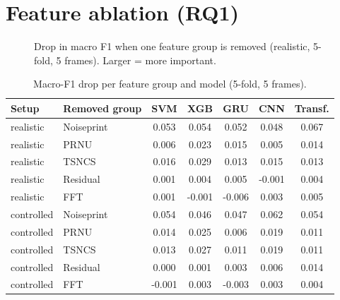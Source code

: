 \documentclass[11pt,a4paper]{article}
\begin{document}
\section{Feature ablation (RQ1)}
\begin{figure}[H]\centering{}\caption{Drop in macro F1 when one feature group is removed (realistic, 5-fold, 5 frames). Larger = more important.}\label{fig:ablation}\end{figure}
\begin{table}[H]\centering\small\caption{Macro-F1 drop per feature group and model (5-fold, 5 frames).}\begin{tabular}{llccccc}\toprule Setup & Removed group & SVM & XGB & GRU & CNN & Transf. \\\midrule
realistic & Noiseprint & 0.053 & 0.054 & 0.052 & 0.048 & 0.067 \\
realistic & PRNU & 0.006 & 0.023 & 0.015 & 0.005 & 0.014 \\
realistic & TSNCS & 0.016 & 0.029 & 0.013 & 0.015 & 0.013 \\
realistic & Residual & 0.001 & 0.004 & 0.005 & -0.001 & 0.004 \\
realistic & FFT & 0.001 & -0.001 & -0.006 & 0.003 & 0.005 \\
controlled & Noiseprint & 0.054 & 0.046 & 0.047 & 0.062 & 0.054 \\
controlled & PRNU & 0.014 & 0.025 & 0.006 & 0.019 & 0.011 \\
controlled & TSNCS & 0.013 & 0.027 & 0.011 & 0.019 & 0.011 \\
controlled & Residual & 0.000 & 0.001 & 0.003 & 0.006 & 0.014 \\
controlled & FFT & -0.001 & 0.003 & -0.003 & 0.003 & 0.004 \\
\bottomrule\end{tabular}\end{table}
\end{document}

